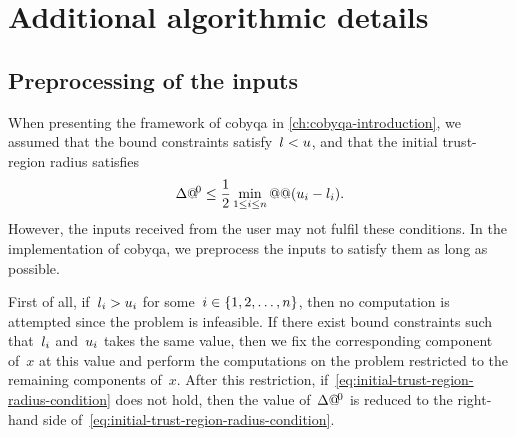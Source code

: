 \section{Additional algorithmic details}
\label{sec:implementation-details}

\subsection{Preprocessing of the inputs}

When presenting the framework of \gls{cobyqa} in \cref{ch:cobyqa-introduction}, we assumed that the bound constraints satisfy~$l < u$, and that the initial trust-region radius satisfies
\begin{equation}
    \label{eq:initial-trust-region-radius-condition}
    \rad[0] \le \frac{1}{2} \min_{1 \le i \le n} @@ (\xu_i - \xl_i).
\end{equation}
However, the inputs received from the user may not fulfil these conditions.
In the implementation of \gls{cobyqa}, we preprocess the inputs to satisfy them as long as possible.

First of all, if~$l_i > u_i$ for some~$i \in \{1, 2, \dots, n\}$, then no computation is attempted since the problem is infeasible.
If there exist bound constraints such that~$l_i$ and~$u_i$ takes the same value, then we fix the corresponding component of~$x$ at this value and perform the computations on the problem restricted to the remaining components of~$x$.
After this restriction, if~\cref{eq:initial-trust-region-radius-condition} does not hold, then the value of~$\rad[0]$ is reduced to the right-hand side of~\cref{eq:initial-trust-region-radius-condition}.


